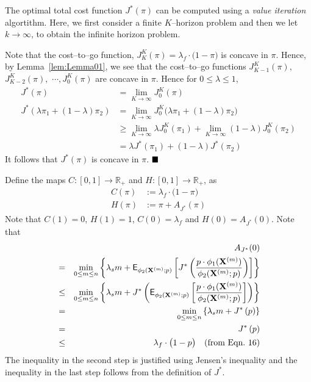 \documentclass[journal]{IEEEtran}
\newcommand{\SPHI}[1]{\phi_2({\bf X}^{({#1})} ;p)}
\begin{document}
The optimal total cost function $J^*(\pi)$ can be computed using a {\em
value iteration} algortithm. Here, we first consider a finite
$K$--horizon problem and then we let $k \to \infty$, to obtain the
infinite horizon problem. 

Note that the cost--to--go function, $J_K^K(\pi) = 
\lambda_f\cdot\big(1 - \pi\big)$ is concave in $\pi$. Hence, by 
Lemma~\ref{lem:Lemma01}, we see that the cost--to--go functions  
$J_{K-1}^K(\pi),$ $J_{K-2}^K(\pi),$ $\cdots, J_0^K(\pi)$ are concave in
$\pi$. Hence for $0 \le \lambda \le 1$,
\begin{align*} 
J^*(\pi) & = \lim_{K \rightarrow \infty} J^K_0(\pi)\\
J^*(\lambda \pi_1 + (1-\lambda)\pi_2) & = \lim_{K \rightarrow \infty} J^K_0\Big(\lambda\pi_1+(1-\lambda)\pi_2\Big)\\
& \ge \lim_{K \rightarrow \infty} \lambda J^K_0(\pi_1)+ \lim_{K \rightarrow \infty} (1-\lambda)J^K_0(\pi_2)\\
& = \lambda J^*(\pi_1)+(1-\lambda)J^*(\pi_2)
\end{align*}
It follows that $J^*(\pi)$ is concave in $\pi$.
$\hfill\blacksquare$








Define the maps $C:[0,1] \to \mathbb{R}_+$ and $H:[0,1] \to \mathbb{R}_+$, as 
\begin{align*} 
C(\pi)     & := \lambda_f\cdot\big(1 - \pi\big)\\
H(\pi)     & := \pi + A_{J^*}(\pi) 
\end{align*}
Note that $C(1) =  0$, $H(1) =  1$, $C(0) =   \lambda_f$ and $H(0) =   A_{J^*}(0)$.
Note that
\begin{eqnarray*} 
& &  A_{J^*}(0)\\
 & = & \min_{0 \le m \le n } \left\{\lambda_s m +  {\mathsf E}_{\SPHI{m}}\left[J^*\left(\frac{{p}\cdot\phi_1({\bf X}^{(m)})}{\phi_2({\bf X}^{(m)};p)}\right)\right] \right\}\\
 & \le & \min_{0 \le m \le n } \left\{\lambda_s m +  J^*\left({\mathsf
 E}_{\SPHI{m}}\left[\frac{p\cdot\phi_1({\bf X}^{(m)})}{\phi_2({\bf
 X}^{(m)};p)}\right]\right) \right\} \\
 &    = & \min_{0 \le m \le n } \left\{\lambda_s m + J^*\left(p\right) \right\}\\
 &    = & J^*\left(p\right)\\
&	 \le & \lambda_f\cdot\big(1 - p\big) \ \ \ \text{(from Eqn.~16)} 
\end{eqnarray*}
The inequality in the second step is justified using Jensen's inequality and 
the inequality in the last step follows from the definition of $J^*$. 
\end{document}
